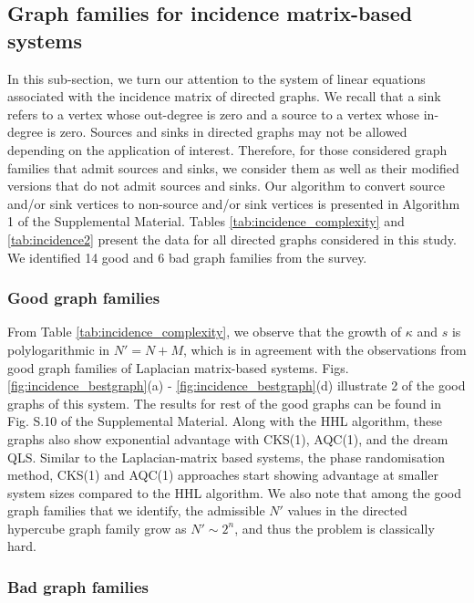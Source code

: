 \documentclass[%
 reprint,
 superscriptaddress,
 amsmath,amssymb,
 aps,
 pra,
floatfix,
nofootinbib,
]{revtex4-2}
\theoremstyle{definition}
\theoremstyle{remark}
\begin{document}
\subsection{Graph families for incidence matrix-based systems} \label{sec:IG}

In this sub-section, we turn our attention to the system of linear equations associated with the incidence matrix of directed graphs. We recall that a sink refers to a vertex whose out-degree is zero and a source to a vertex whose in-degree is zero. Sources and sinks in directed graphs may not be allowed depending on the application of interest. Therefore, for those considered graph families that admit sources and sinks, we consider them as well as their modified versions that do not admit sources and sinks. Our algorithm to convert source and/or sink vertices to non-source and/or sink vertices is presented in Algorithm 1 of the Supplemental Material. Tables \ref{tab:incidence_complexity} and \ref{tab:incidence2} present the data for all directed graphs considered in this study. We identified 14 good and 6 bad graph families from the survey. 

\subsubsection{Good graph families} 

From Table \ref{tab:incidence_complexity}, we observe that the growth of $\kappa$ and $s$ is polylogarithmic in $N'=N+M$, which is in agreement with the observations from good graph families of Laplacian matrix-based systems. Figs. \ref{fig:incidence_bestgraph}(a) - \ref{fig:incidence_bestgraph}(d) illustrate 2 of the good graphs of this system. The results for rest of the good graphs can be found in Fig. S.10 of the Supplemental Material. Along with the HHL algorithm, these graphs also show exponential advantage with CKS(1), AQC(1), and the dream QLS. Similar to the Laplacian-matrix based systems, the phase randomisation method, CKS(1) and AQC(1) approaches start showing advantage at smaller system sizes compared to the HHL algorithm. We also note that among the good graph families that we identify, the admissible $N'$ values in the directed hypercube graph family grow as $N' \sim 2^n$, and thus the problem is classically hard. 

\subsubsection{Bad graph families} 
\end{document}
